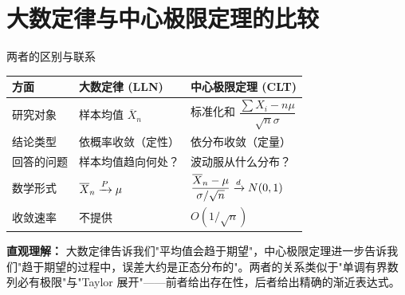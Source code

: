 \section{大数定律与中心极限定理的比较}

\begin{myTheorem}{两者的区别与联系}
\begin{center}
\begin{tabular}{p{4cm}p{5cm}p{5cm}}
\toprule
\textbf{方面} & \textbf{大数定律 (LLN)} & \textbf{中心极限定理 (CLT)} \\
\midrule
研究对象 & 样本均值 $\overline{X}_n$ & 标准化和 $\dfrac{\sum X_i - n\mu}{\sqrt{n}\sigma}$ \\
结论类型 & 依概率收敛（定性） & 依分布收敛（定量） \\
回答的问题 & 样本均值趋向何处？ & 波动服从什么分布？ \\
数学形式 & $\overline{X}_n \xrightarrow{P} \mu$ & $\dfrac{\overline{X}_n - \mu}{\sigma/\sqrt{n}} \xrightarrow{d} N(0,1)$ \\
收敛速率 & 不提供 & $O(1/\sqrt{n})$ \\
\bottomrule
\end{tabular}
\end{center}

\textbf{直观理解：} 大数定律告诉我们"平均值会趋于期望"，中心极限定理进一步告诉我们"趋于期望的过程中，误差大约是正态分布的"。两者的关系类似于"单调有界数列必有极限"与"Taylor 展开"——前者给出存在性，后者给出精确的渐近表达式。
\end{myTheorem}
